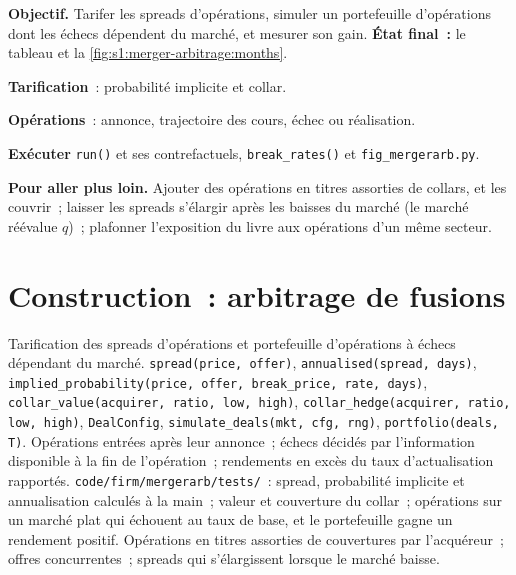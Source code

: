 \begin{tutorial}
\textbf{Objectif.} Tarifer les spreads d'opérations, simuler un portefeuille d'opérations dont les échecs dépendent du marché, et mesurer son gain. \textbf{État final~:} le tableau
et la \cref{fig:s1:merger-arbitrage:months}.
\begin{tutsteps}
\item \textbf{Tarification}~: probabilité implicite et collar.
\label{lst:s1:merger-arbitrage:pricing}
\item \textbf{Opérations}~: annonce, trajectoire des cours, échec ou réalisation.
\label{lst:s1:merger-arbitrage:deals}
\item \textbf{Exécuter} \texttt{run()} et ses contrefactuels, \texttt{break\_rates()} et \texttt{fig\_mergerarb.py}.
\end{tutsteps}
\textbf{Pour aller plus loin.} Ajouter des opérations en titres assorties de collars, et les couvrir~; laisser les spreads s'élargir après les baisses du marché (le marché réévalue $q$)~; plafonner
l'exposition du livre aux opérations d'un même secteur.
\end{tutorial}

\section{Construction~: arbitrage de fusions}\label{bld:s1:merger-arbitrage:mergerarb}

\begin{build}
 Tarification des spreads d'opérations et portefeuille d'opérations à échecs dépendant du marché.
 \texttt{spread(price, offer)}, \texttt{annualised(spread, days)}, \texttt{implied\_probability(price, offer, break\_price, rate, days)},
\texttt{collar\_value(acquirer, ratio, low, high)}, \texttt{collar\_hedge(acquirer, ratio, low, high)}, \texttt{DealConfig}, \texttt{simulate\_deals(mkt, cfg, rng)},
\texttt{portfolio(deals, T)}.
 Opérations entrées après leur annonce~; échecs décidés par l'information disponible à la fin de l'opération~; rendements en excès du taux d'actualisation rapportés.
 \texttt{code/firm/mergerarb/tests/}~: spread, probabilité implicite et annualisation calculés à la main~; valeur et couverture du collar~; opérations sur un marché plat
qui échouent au taux de base, et le portefeuille gagne un rendement positif.
 Opérations en titres assorties de couvertures par l'acquéreur~; offres concurrentes~; spreads qui s'élargissent lorsque le marché baisse.
\end{build}

